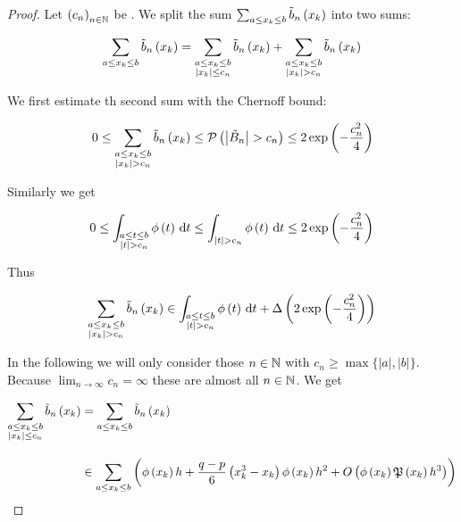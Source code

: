 \begin{proof}
  Let $\left({c_n}\right)_{{n}\in\mathbb N}$ be . We split the sum $\sum_{a \le x_{k} \le b} \tilde b_{n}\left({x_{k}}\right)$ into two sums:

  \begin{align}
    \sum_{a \le x_{k} \le b} \tilde b_{n}\left({x_{k}}\right) = \sum_{\substack{a \le x_{k} \le b \\ \left|{x_{k}}\right| \le c_n}} \tilde b_{n}\left({x_{k}}\right) + \sum_{\substack{a \le x_{k} \le b \\ \left|{x_{k}}\right| > c_n}} \tilde b_{n}\left({x_{k}}\right)
  \end{align}

  \noindent We first estimate th second sum with the Chernoff bound:

  \begin{align}
    0 \le \sum_{\substack{a \le x_{k} \le b \\ \left|{x_{k}}\right| > c_n}} \tilde b_{n}\left({x_{k}}\right) \le \mathcal P\left({\left|{\tilde B_{n}}\right| > c_n}\right) \le 2\exp\left( {-\frac{c_n^2}{4}} \right)
  \end{align}

  \noindent Similarly we get

  \begin{align}
    0 \le \int_{\substack{a \le t \le b\\\left|{t}\right| > c_n}} \phi\left( {t} \right)\,\mathrm d{t} \le \int_{\left|{t}\right| > c_n} \phi\left( {t} \right) \,\mathrm d{t} \le 2\exp\left( {-\frac{c_n^2}{4}} \right)
  \end{align}

  \noindent Thus

  \begin{align}
    \sum_{\substack{a \le x_{k} \le b \\ \left|{x_{k}}\right| > c_n}} \tilde b_{n}\left({x_{k}}\right) \in \int_{\substack{a \le t \le b\\\left|{t}\right| > c_n}} \phi\left( {t} \right)\,\mathrm d{t} + \Delta\left( {2\exp\left( {-\frac{c_n^2}4} \right)} \right)
  \end{align}

    

  \noindent In the following we will only consider those $n\in\mathbb N$ with $c_n \ge \max\{|a|,|b|\}$. Because $\lim_{n\to\infty} c_n = \infty$ these are almost all $n\in\mathbb N$. We get

  \begin{align}
    \sum_{\substack{a \le \x \le b \\ \abs{\x} \le c_n}} \bb{\x} & = \sum_{a \le \x \le b} \bb{\x} \bnl
    &\in \sum_{a \le \x \le b} \left(\fphi{\x} h +\frac{q-p}6 \left(\x^3 - \x\right) \fphi{\x} h^2 + \bigo{\fphi{\x}\pol{\x}h^3}\right)
  \end{align}


\end{proof}
